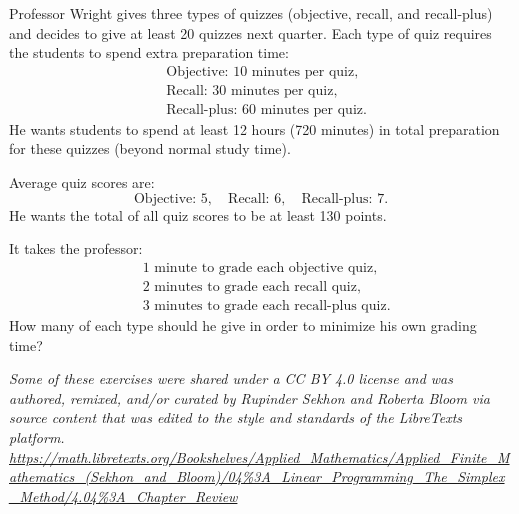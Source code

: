 \begin{ex}{}{}
Professor Wright gives three types of quizzes (objective, recall, and recall-plus) and decides to give at least 20 quizzes next quarter. Each type of quiz requires the students to spend extra preparation time:
\[
\begin{aligned}
&\text{Objective: } 10 \text{ minutes per quiz},\\
&\text{Recall: } 30 \text{ minutes per quiz},\\
&\text{Recall-plus: } 60 \text{ minutes per quiz}.
\end{aligned}
\]
He wants students to spend at least 12 hours (720 minutes) in total preparation for these quizzes (beyond normal study time).

Average quiz scores are:
\[
\text{Objective: } 5,\quad
\text{Recall: } 6,\quad
\text{Recall-plus: } 7.
\]
He wants the total of all quiz scores to be at least 130 points.

It takes the professor:
\[
\begin{aligned}
& 1 \text{ minute to grade each objective quiz},\\
& 2 \text{ minutes to grade each recall quiz},\\
& 3 \text{ minutes to grade each recall-plus quiz}.
\end{aligned}
\]
How many of each type should he give in order to minimize his own grading time?
\end{ex}

\newcommand{\attribution}[1]{%
{\color{purple}
  \begingroup
  \sffamily\itshape %
  #1%
  \endgroup
}}

\attribution{Some of these exercises were shared under a CC BY 4.0 license and was authored, remixed, and/or curated by Rupinder Sekhon and Roberta Bloom via source content that was edited to the style and standards of the LibreTexts platform.
\url{https://math.libretexts.org/Bookshelves/Applied_Mathematics/Applied_Finite_Mathematics_(Sekhon_and_Bloom)/04\%3A_Linear_Programming_The_Simplex_Method/4.04\%3A_Chapter_Review}}







